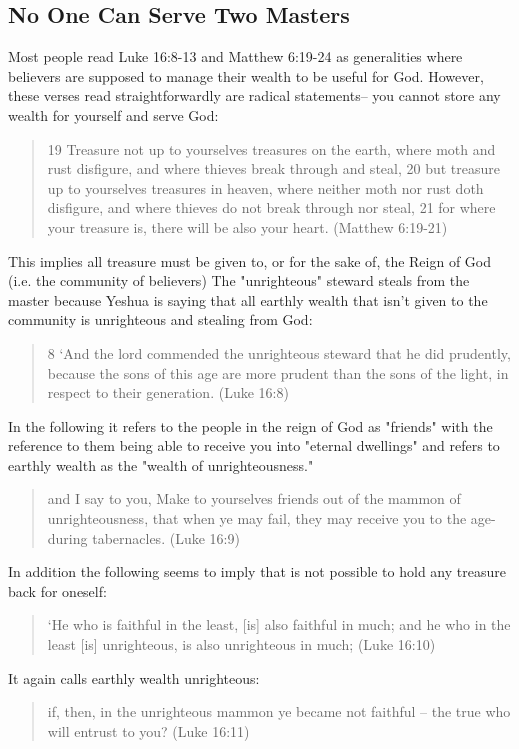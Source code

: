 \documentclass[11pt]{article}
\begin{document}
\subsection{No One Can Serve Two Masters}
Most people read Luke 16:8-13 and Matthew 6:19-24 as generalities where believers are supposed to manage their wealth to be useful for God. However, these verses read straightforwardly are radical statements-- you cannot store any wealth for yourself and serve God:
\begin{quote} 19 Treasure not up to yourselves treasures on the earth, where moth and rust disfigure, and where thieves break through and steal, 20 but treasure up to yourselves treasures in heaven, where neither moth nor rust doth disfigure, and where thieves do not break through nor steal, 21 for where your treasure is, there will be also your heart. (Matthew 6:19-21)
\end{quote}
This implies all treasure must be given to, or for the sake of, the Reign of God (i.e. the community of believers) 
The "unrighteous" steward steals from the master because Yeshua is saying that all earthly wealth that isn't given to the community is unrighteous and stealing from God:  
\begin{quote}
8 ‘And the lord commended the unrighteous steward that he did prudently, because the sons of this age are more prudent than the sons of the light, in respect to their generation. (Luke 16:8)
\end{quote}
In the following it refers to the people in the reign of God as "friends" with the reference to them being able to receive you into "eternal dwellings" and refers to earthly wealth as the "wealth of unrighteousness."
\begin{quote}
and I say to you, Make to yourselves friends out of the mammon of unrighteousness, that when ye may fail, they may receive you to the age-during tabernacles. (Luke 16:9) \end{quote}
In addition the following seems to imply that is not possible to hold any treasure back for oneself: 
\begin{quote}
`He who is faithful in the least, [is] also faithful in much; and he who in the least [is] unrighteous, is also unrighteous in much; (Luke 16:10)
\end{quote}
It again calls earthly wealth unrighteous: 
\begin{quote}
if, then, in the unrighteous mammon ye became not faithful -- the true who will entrust to you? (Luke 16:11) 
\end{quote}
\end{document}
